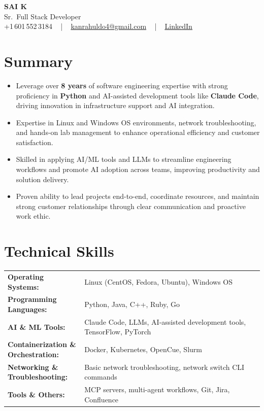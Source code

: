 \documentclass[letterpaper,11pt]{article}
\newcommand{\resumeItem}[1]{
  \item\footnotesize{
    {#1 \vspace{-2pt}}
  }
}
\newcommand{\resumeItemListStart}{\begin{itemize}[leftmargin=*]}
\newcommand{\resumeItemListEnd}{\end{itemize}\vspace{-5pt}}
\begin{document}
\begin{center}
    {\fontsize{14pt}{12pt}\selectfont \textbf{\MakeUppercase{Sai K}}}\\ \vspace{2pt}
    \fontsize{10pt}{12pt}\selectfont Sr.\ Full Stack Developer\\ \vspace{2pt}
    \fontsize{10pt}{12pt}\selectfont +1\,601\,552\,3184 ~ | ~
    \href{mailto:kanrahuldo4@gmail.com}{kanrahuldo4@gmail.com} ~ | ~
    \href{https://www.linkedin.com/in/srrrk/}{\color{blue}\underline{LinkedIn}}
    \vspace{-10pt}
\end{center}

\section{Summary}
\fontsize{9pt}{10pt}\selectfont
\resumeItemListStart
  \resumeItem{Leverage over \textbf{8 years} of software engineering expertise with strong proficiency in \textbf{Python} and AI-assisted development tools like \textbf{Claude Code}, driving innovation in infrastructure support and AI integration.}
  \resumeItem{Expertise in Linux and Windows OS environments, network troubleshooting, and hands-on lab management to enhance operational efficiency and customer satisfaction.}
  \resumeItem{Skilled in applying AI/ML tools and LLMs to streamline engineering workflows and promote AI adoption across teams, improving productivity and solution delivery.}
  \resumeItem{Proven ability to lead projects end-to-end, coordinate resources, and maintain strong customer relationships through clear communication and proactive work ethic.}
\resumeItemListEnd
\vspace{-6pt}

\section{Technical Skills}
\vspace{-14pt}
\begin{table}[h]
\fontsize{9pt}{10pt}\selectfont
\begin{tabular}{p{0.3\linewidth} p{0.7\linewidth}}
\textbf{Operating Systems:} & Linux (CentOS, Fedora, Ubuntu), Windows OS \\
\textbf{Programming Languages:} & Python, Java, C++, Ruby, Go \\
\textbf{AI \& ML Tools:} & Claude Code, LLMs, AI-assisted development tools, TensorFlow, PyTorch \\
\textbf{Containerization \& Orchestration:} & Docker, Kubernetes, OpenCue, Slurm \\
\textbf{Networking \& Troubleshooting:} & Basic network troubleshooting, network switch CLI commands \\
\textbf{Tools \& Others:} & MCP servers, multi-agent workflows, Git, Jira, Confluence \\
\end{tabular}
\end{table}
\vspace{-15pt}
\end{document}
